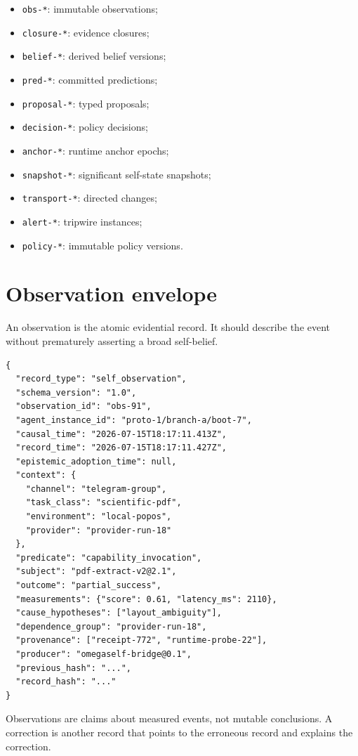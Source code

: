 \documentclass[11pt,oneside]{report}
\begin{document}
\begin{itemize}
  \item \texttt{obs-*}: immutable observations;
  \item \texttt{closure-*}: evidence closures;
  \item \texttt{belief-*}: derived belief versions;
  \item \texttt{pred-*}: committed predictions;
  \item \texttt{proposal-*}: typed proposals;
  \item \texttt{decision-*}: policy decisions;
  \item \texttt{anchor-*}: runtime anchor epochs;
  \item \texttt{snapshot-*}: significant self-state snapshots;
  \item \texttt{transport-*}: directed changes;
  \item \texttt{alert-*}: tripwire instances;
  \item \texttt{policy-*}: immutable policy versions.
\end{itemize}

\section{Observation envelope}

An observation is the atomic evidential record. It should describe the event without prematurely asserting a broad self-belief.

\begin{lstlisting}[caption={Illustrative self-observation envelope}]
{
  "record_type": "self_observation",
  "schema_version": "1.0",
  "observation_id": "obs-91",
  "agent_instance_id": "proto-1/branch-a/boot-7",
  "causal_time": "2026-07-15T18:17:11.413Z",
  "record_time": "2026-07-15T18:17:11.427Z",
  "epistemic_adoption_time": null,
  "context": {
    "channel": "telegram-group",
    "task_class": "scientific-pdf",
    "environment": "local-popos",
    "provider": "provider-run-18"
  },
  "predicate": "capability_invocation",
  "subject": "pdf-extract-v2@2.1",
  "outcome": "partial_success",
  "measurements": {"score": 0.61, "latency_ms": 2110},
  "cause_hypotheses": ["layout_ambiguity"],
  "dependence_group": "provider-run-18",
  "provenance": ["receipt-772", "runtime-probe-22"],
  "producer": "omegaself-bridge@0.1",
  "previous_hash": "...",
  "record_hash": "..."
}
\end{lstlisting}

\begin{invariantbox}
Observations are claims about measured events, not mutable conclusions. A correction is another record that points to the erroneous record and explains the correction.
\end{invariantbox}
\end{document}
